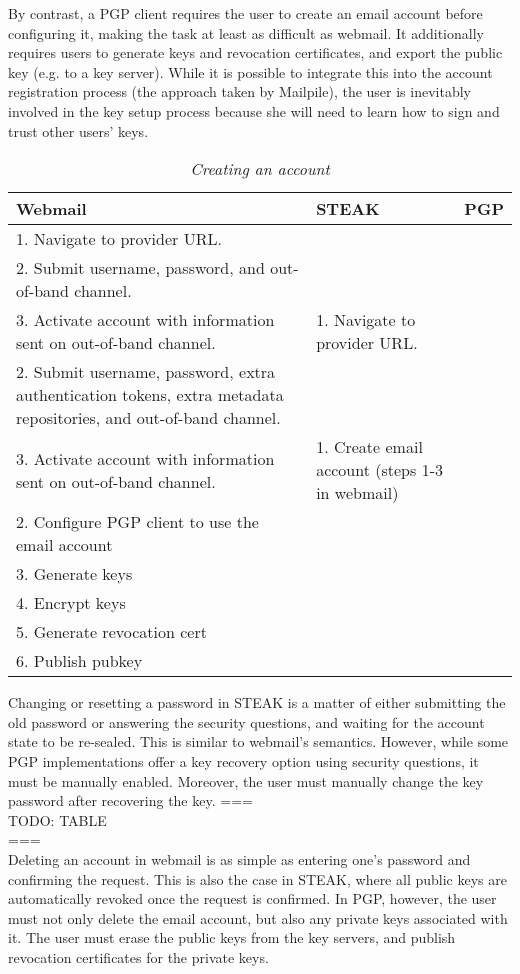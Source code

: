 By contrast, a PGP client requires the user to create an email account before configuring it, making the task at least as difficult as webmail.  It additionally requires users to generate keys and revocation certificates, and export the public key (e.g. to a key server).  While it is possible to integrate this into the account registration process (the approach taken by Mailpile), the user is inevitably involved in the key setup process because she will need to learn how to sign and trust other users’ keys. 

\begin{table*}[ht!]
\begin{tabular}{ | l | l | l |}
\hline
\textbf{Webmail} & \textbf{STEAK} & \textbf{PGP} \\
\hline
1. Navigate to provider URL. \\ 
2. Submit username, password, and out-of-band channel. \\ 
3. Activate account with information sent on out-of-band channel. &

1.  Navigate to provider URL. \\
2.  Submit username, password, extra authentication tokens, extra metadata repositories, and out-of-band channel. \\
3.  Activate account with information sent on out-of-band channel. &

1.  Create email account (steps 1-3 in webmail) \\ 
2.  Configure PGP client to use the email account \\
3.  Generate keys \\
4.  Encrypt keys \\
5.  Generate revocation cert \\
6.  Publish pubkey \\
\hline
\end{tabular}
\caption{\it Creating an account}
\label{tab:account-creation}
\end{table*}


Changing or resetting a password in STEAK is a matter of either submitting the old password or answering the security questions, and waiting for the account state to be re-sealed.  This is similar to webmail’s semantics.  However, while some PGP implementations offer a key recovery option using security questions, it must be manually enabled.  Moreover, the user must manually change the key password after recovering the key.
===\\
TODO: TABLE \\
===\\
Deleting an account in webmail is as simple as entering one’s password and confirming the request.  This is also the case in STEAK, where all public keys are automatically revoked once the request is confirmed.  In PGP, however, the user must not only delete the email account, but also any private keys associated with it.  The user must erase the public keys from the key servers, and publish revocation certificates for the private keys.

